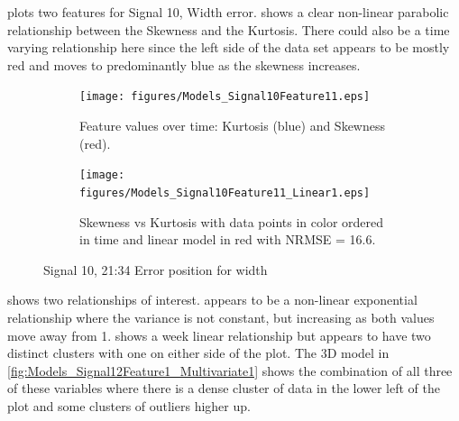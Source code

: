 \documentclass[]{article}
\begin{document}
 plots two features for Signal 10, Width error.  shows a clear non-linear parabolic relationship between the Skewness and the Kurtosis. There could also be a time varying relationship here since the left side of the data set appears to be mostly red and moves to predominantly blue as the skewness increases.
\begin{figure}[H]
    \centering
		\begin{subfigure}[t]{.45\textwidth}
		  \centering
    			\texttt{[image: figures/Models\_Signal10Feature11.eps]}
		  	\caption{Feature values over time: Kurtosis (blue) and Skewness (red).}
		  	\label{fig:Models_Signal10Feature7}
		\end{subfigure}
		\hspace*{\fill}%
		\begin{subfigure}[t]{.45\textwidth}
		  \centering
 		   	\texttt{[image: figures/Models\_Signal10Feature11\_Linear1.eps]}
		  	\caption{Skewness vs Kurtosis with data points in color ordered in time and linear model in red with \gls{NRMSE} = 16.6.}
		  	\label{fig:Models_Signal10Feature11_Linear1}
		\end{subfigure}
    \caption{Signal 10, 21:34 Error position for width}
    \label{fig:Models_Signal10Feature11_Caption}
\end{figure}



 shows two relationships of interest.  appears to be a non-linear exponential relationship where the variance is not constant, but increasing as both values move away from 1.  shows a week linear relationship but appears to have two distinct clusters with one on either side of the plot. The 3D model in \cref{fig:Models_Signal12Feature1_Multivariate1} shows the combination of all three of these variables where there is a dense cluster of data in the lower left of the plot and some clusters of outliers higher up.
\end{document}
